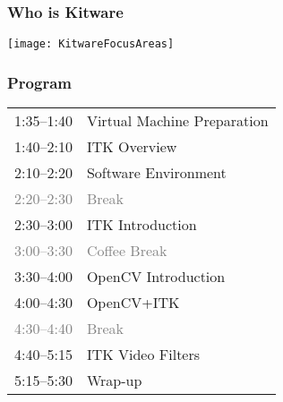 \documentclass[18pt]{beamer}
\begin{document}
\begin{frame}
\frametitle{Who is Kitware}
\begin{center}
\texttt{[image: KitwareFocusAreas]}
\end{center}
\end{frame}

\begin{frame}
\frametitle{Program}


\begin{tabular}{ll}
1:35--1:40 & Virtual Machine Preparation \\
1:40--2:10 & ITK Overview \\
2:10--2:20 & Software Environment \\
\textcolor{gray}{2:20--2:30} & \textcolor{gray}{Break} \\
2:30--3:00 & ITK Introduction \\
\textcolor{gray}{3:00--3:30} & \textcolor{gray}{Coffee Break} \\
3:30--4:00 & OpenCV Introduction \\
4:00--4:30 & OpenCV+ITK \\
\textcolor{gray}{4:30--4:40} & \textcolor{gray}{Break} \\
4:40--5:15 & ITK Video Filters \\
5:15--5:30 & Wrap-up
\end{tabular}

\end{frame}



\end{document}
